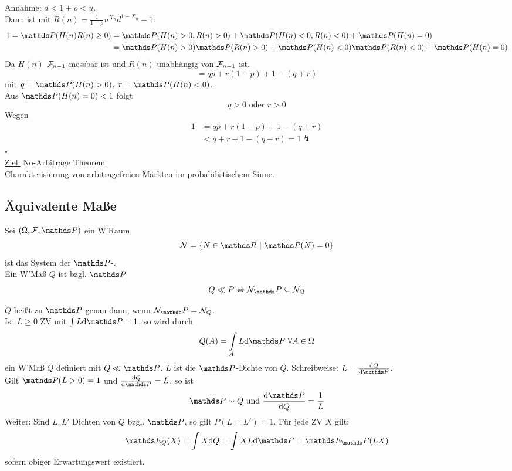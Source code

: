 Annahme: $d<1+\rho<u$.\\
Dann ist mit $R(n)=\frac{1}{1+\rho}u^{X_n}d^{1-X_n}-1$:
\begin{equation*}
\begin{aligned}
	1=\Pw(H(n)R(n)\ge 0)&=\Pw(H(n)>0,R(n)>0)+\Pw(H(n)<0,R(n)<0)+\Pw(H(n)=0)\\
	&=\Pw(H(n)>0)\Pw(R(n)>0)+\Pw(H(n)<0)\Pw(R(n)<0)+\Pw(H(n)=0)
\end{aligned}
\end{equation*}
Da $H(n)$ $\mathcal{F}_{n-1}$-messbar ist und $R(n)$ unabhängig von $\mathcal{F}_{n-1}$ ist.
\[
=qp+r(1-p)+1-(q+r)
\]
mit $q=\Pw(H(n)>0),~r=\Pw(H(n)<0)$.\\
Aus $\Pw(H(n)=0)<1$ folgt
\[
q>0 \text{ oder } r>0
\]
Wegen
\begin{equation*}
\begin{aligned}
	1&=qp+r(1-p)+1-(q+r)\\
	&<q+r+1-(q+r)=1\lightning
\end{aligned}
\end{equation*}
\hfill $\square$\\
\newpage
\uline{Ziel:} No-Arbitrage Theorem\\
Charakterisierung von arbitragefreien Märkten im probabilistischem Sinne.

\subsection{Äquivalente Maße}
\label{sub:eq_mas}
Sei $(\Omega,\F,\Pw)$ ein W'Raum.
\[
\mc{N}=\{N\in \R~|~\Pw(N)=0\}
\]
ist das System der $\Pw$-.\\
Ein W'Maß $Q$ ist  bzgl. $\Pw$
\[
Q\ll P \Leftrightarrow \mc{N}_\Pw \subseteq \mc{N}_Q
\]

$Q$ heißt  zu $\Pw$ genau dann, wenn $\mc{N}_\Pw=\mc{N}_Q$.\\
Ist $L\ge 0$ ZV mit $\int L\dint \Pw=1$, so wird durch
\[
Q(A)=\int\limits_A L\dint \Pw~\forall A\in \Omega
\]
ein W'Maß $Q$ definiert mit $Q\ll \Pw$.
$L$ ist die $\Pw$-Dichte von $Q$.
Schreibweise: $L=\frac{\dint Q}{\dint \Pw}$.\\
Gilt $\Pw(L>0)=1$ und $\frac{\dint Q}{\dint \Pw}=L$, so ist
\[
\Pw \sim Q \text{ und } \frac{\dint \Pw}{\dint Q}=\frac{1}{L}
\]
Weiter: Sind $L,L'$ Dichten von $Q$ bzgl. $\Pw$, so gilt $P(L=L')=1$. Für jede ZV $X$ gilt:
\[
\E_Q(X)=\int X\dint Q=\int XL\dint\Pw=\E_\Pw(LX)
\]
sofern obiger Erwartungswert existiert.\\


